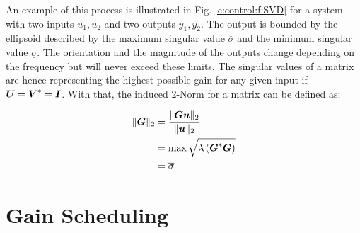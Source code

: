 An example of this process is illustrated in Fig. \ref{c:control:f:SVD} for a system with two inputs $u_1,u_2$ and two outputs $y_1,y_2$. The output is bounded by the ellipsoid described by the maximum singular value $\overline{\sigma}$ and the minimum singular value $\underline{\sigma}$. The orientation and the magnitude of the outputs change depending on the frequency but will never exceed these limits. The singular values of a matrix are hence representing the highest possible gain for any given input if $\mbox{\boldmath$U$} = \mbox{\boldmath$V$}^* = \mbox{\boldmath$I$}$. With that, the induced 2-Norm for a matrix can be defined as:

\begin{align}
\begin{split}
\lVert \mbox{\boldmath$G$} \rVert_2 &= \frac{\lVert \mbox{\boldmath$G$}\mbox{\boldmath$u$}\rVert_2}{\lVert \mbox{\boldmath$u$} \rVert_2} \\
&= \max \sqrt{\lambda\left( \mbox{\boldmath$G$}^* \mbox{\boldmath$G$}\right)} \\
&= \overline{\sigma}
\end{split}
\label{c:control:e:MaxSingularValue}
\end{align}

\section{Gain Scheduling} %
\label{c:control:s:gainsched}

